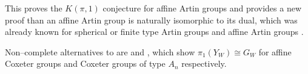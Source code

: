 This proves the $K(\pi, 1)$ conjecture for affine Artin groups and provides a new proof than an affine Artin group is naturally isomorphic to its dual, which was already known for spherical or finite type Artin groups \cite{bessis_dual_2003} and affine Artin groups \cite{mccammond_sulway_artin_2017}.

Non--complete alternatives to \cite{brieskorn_fundamentalgruppe_1971} are \cite{vietdung_fundamental_1983} and \cite{fox_neuwirth_braid_1962}, which show $\pi_1(Y_W) \cong G_W$ for affine Coxeter groups and Coxeter groups of type $A_n$ respectively.

% 
